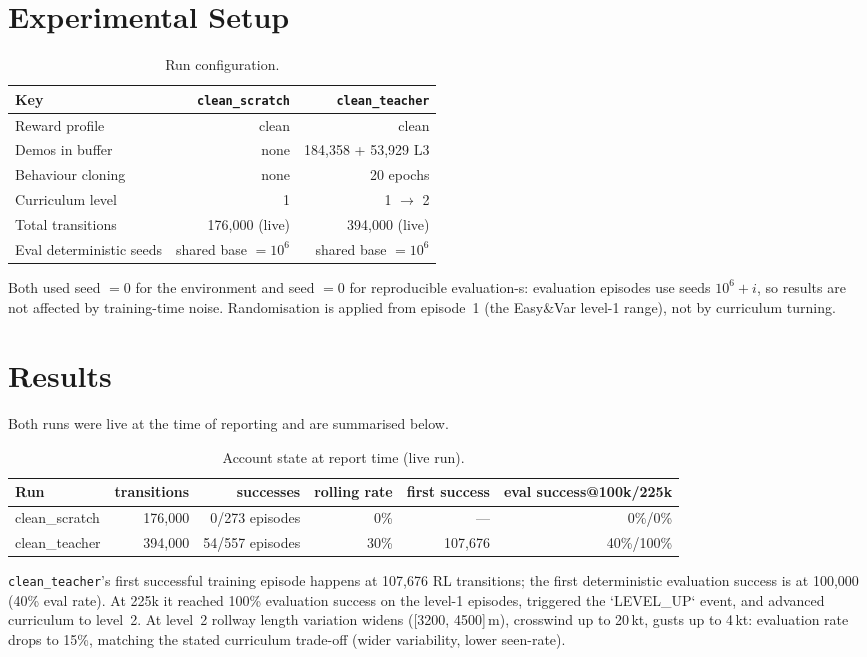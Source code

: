 \documentclass[11pt,a4paper]{article}
\begin{document}
\section{Experimental Setup}
\begin{table}[h]
\centering\small
\begin{tabular}{lrr}
\toprule
Key & \texttt{clean\_scratch} & \texttt{clean\_teacher} \\
\midrule
Reward profile & clean & clean \\
Demos in buffer & none & 184,358 + 53,929 L3 \\
Behaviour cloning & none & 20 epochs \\
Curriculum level & 1 & 1 $\to$ 2 \\
Total transitions & 176,000 (live) & 394,000 (live) \\
Eval deterministic seeds & shared base $= 10^6$ & shared base $= 10^6$ \\
\bottomrule
\end{tabular}
\caption{Run configuration.}
\end{table}
Both used seed $=0$ for the environment and seed $=0$ for reproducible evaluation-s: evaluation episodes
use seeds $10^6 + i$, so results are not affected by training-time noise. Randomisation is applied from
episode~1 (the Easy\&Var level-1 range), not by curriculum turning.

\section{Results}
Both runs were live at the time of reporting and are summarised below.
\begin{table}[h]
\centering\small
\begin{tabular}{lrrrrr}
\toprule
Run & transitions & successes & rolling rate & first success & eval success@100k/225k \\
\midrule
clean\_scratch & 176,000 & 0/273 episodes & 0\% & --- & 0\%/0\% \\
clean\_teacher & 394,000 & 54/557 episodes & 30\% & 107,676 & 40\%/100\% \\
\bottomrule
\end{tabular}
\caption{Account state at report time (live run).}
\end{table}
\texttt{clean\_teacher}'s first successful training episode happens at 107,676 RL transitions; the first
deterministic evaluation success is at 100,000 (40\% eval rate). At 225k it reached 100\% evaluation success on
the level-1 episodes, triggered the `LEVEL\_UP` event, and advanced curriculum to level~2. At level~2
rollway length variation widens ([3200, 4500]\,m), crosswind up to 20\,kt, gusts up to 4\,kt: evaluation rate
drops to 15\%, matching the stated curriculum trade-off (wider variability, lower seen-rate).
\end{document}

